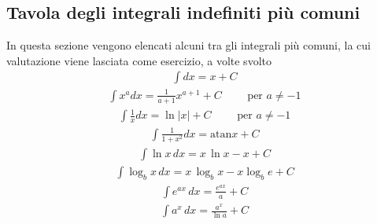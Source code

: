 \documentclass[letterpaper,10pt,italian]{jupyterBook}
\begin{document}
\subsection{Tavola degli integrali indefiniti più comuni}
\label{\detokenize{ch/infinitesimal_calculus/integrals-table:tavola-degli-integrali-indefiniti-piu-comuni}}\label{\detokenize{ch/infinitesimal_calculus/integrals-table:infinitesimal-calculus-integrals-table}}\label{\detokenize{ch/infinitesimal_calculus/integrals-table::doc}}
\sphinxAtStartPar
In questa sezione vengono elencati alcuni tra gli integrali più comuni, la cui valutazione viene lasciata come esercizio, a volte svolto
\begin{equation*}
\begin{split}\int dx             = x + C\end{split}
\end{equation*}\begin{equation*}
\begin{split}\int x^a dx         = \frac{1}{a+1} x^{a+1} + C  \qquad \text{ per } a \ne -1\end{split}
\end{equation*}\begin{equation*}
\begin{split}\int \frac{1}{x} dx = \ln |x| + C  \qquad \text{ per } a \ne -1\end{split}
\end{equation*}\begin{equation*}
\begin{split}\int \frac{1}{1+x^2} dx = \text{atan} x + C\end{split}
\end{equation*}\begin{equation*}
\begin{split}\int \ln x \, dx    = x \, \ln x - x + C\end{split}
\end{equation*}\begin{equation*}
\begin{split}\int \log_b x \, dx    = x \, \log_b x - x \log_b e + C\end{split}
\end{equation*}\begin{equation*}
\begin{split}\int e^{a x} \, dx  = \frac{e^{ax}}{a} + C\end{split}
\end{equation*}\begin{equation*}
\begin{split}\int a^x \, dx  = \frac{a^x}{\ln a} + C\end{split}

\end{equation*}
\end{document}
